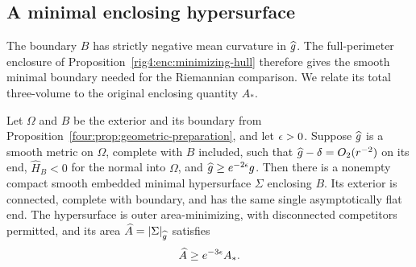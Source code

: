 \subsection{A minimal enclosing hypersurface}

The boundary $B$ has strictly negative mean curvature in $\widehat g$.
The full-perimeter enclosure of
Proposition~\ref{rig4:enc:minimizing-hull} therefore gives the smooth
minimal boundary needed for the Riemannian comparison. We relate its
total three-volume to the original enclosing quantity $A_*$.

\begin{lemma}\label{four:lem:minimal-enclosure}
Let $\Omega$ and $B$ be the exterior and its boundary from
Proposition~\ref{four:prop:geometric-preparation}, and let $\epsilon>0$.
Suppose $\widehat g$ is a smooth metric on $\Omega$, complete with $B$
included, such that $\widehat g-\delta=O_2(r^{-2})$ on its end,
$\widehat H_B<0$ for the normal into $\Omega$, and
$\widehat g\ge e^{-2\epsilon}g$. Then there is a nonempty compact smooth
embedded minimal hypersurface $\Sigma$ enclosing $B$.
Its exterior is connected, complete with boundary,
and has the same single asymptotically flat end.  The hypersurface is
outer area-minimizing, with disconnected competitors permitted, and
its area $\widehat A=|\Sigma|_{\widehat g}$ satisfies
\begin{equation}\label{four:end:area-comparison}
 \widehat A\ge e^{-3\epsilon}A_*.
\end{equation}
\end{lemma}

